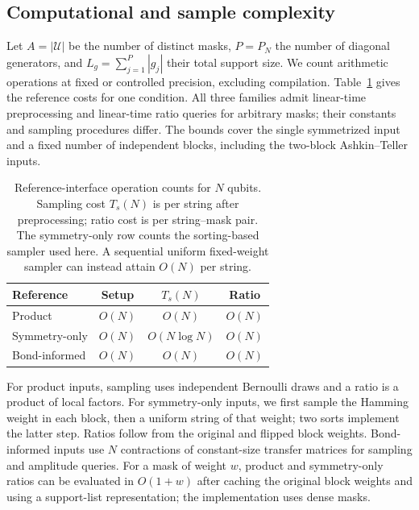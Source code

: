 \subsection{Computational and sample complexity}
\label{sec:estimator-complexity}

Let $A=|\mathcal U|$ be the number of distinct masks, $P=P_N$ the number of diagonal generators, and $L_g=\sum_{j=1}^{P}|g_j|$ their total support size. We count arithmetic operations at fixed or controlled precision, excluding compilation. Table~\ref{tab:reference-cost} gives the reference costs for one condition. All three families admit linear-time preprocessing and linear-time ratio queries for arbitrary masks; their constants and sampling procedures differ. The bounds cover the single symmetrized input and a fixed number of independent blocks, including the two-block Ashkin--Teller inputs.

\begin{table}[tb]
\caption{Reference-interface operation counts for $N$ qubits. Sampling cost $T_s(N)$ is per string after preprocessing; ratio cost is per string--mask pair. The symmetry-only row counts the sorting-based sampler used here. A sequential uniform fixed-weight sampler can instead attain $O(N)$ per string.}
\label{tab:reference-cost}
\centering
\begin{tabular}{lccc}
\toprule
Reference & Setup & $T_s(N)$ & Ratio \\
\midrule
Product & $O(N)$ & $O(N)$ & $O(N)$ \\
Symmetry-only & $O(N)$ & $O(N\log N)$ & $O(N)$ \\
Bond-informed & $O(N)$ & $O(N)$ & $O(N)$ \\
\bottomrule
\end{tabular}
\end{table}

For product inputs, sampling uses independent Bernoulli draws and a ratio is a product of local factors. For symmetry-only inputs, we first sample the Hamming weight in each block, then a uniform string of that weight; two sorts implement the latter step. Ratios follow from the original and flipped block weights. Bond-informed inputs use $N$ contractions of constant-size transfer matrices for sampling and amplitude queries. For a mask of weight $w$, product and symmetry-only ratios can be evaluated in $O(1+w)$ after caching the original block weights and using a support-list representation; the implementation uses dense masks.

